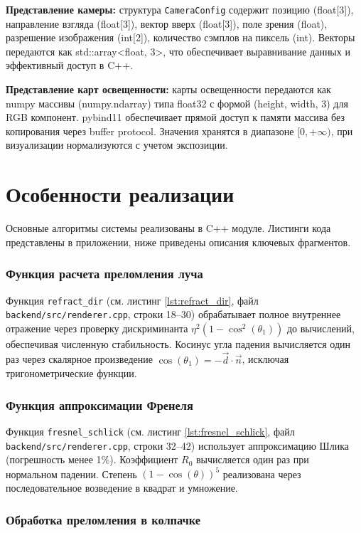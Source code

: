 \textbf{Представление камеры:} структура \texttt{CameraConfig} содержит позицию (float[3]), направление взгляда (float[3]), вектор вверх (float[3]), поле зрения (float), разрешение изображения (int[2]), количество сэмплов на пиксель (int). Векторы передаются как std::array<float, 3>, что обеспечивает выравнивание данных и эффективный доступ в C++.

\textbf{Представление карт освещенности:} карты освещенности передаются как numpy массивы (numpy.ndarray) типа float32 с формой (height, width, 3) для RGB компонент. pybind11 обеспечивает прямой доступ к памяти массива без копирования через buffer protocol. Значения хранятся в диапазоне $[0, +\infty)$, при визуализации нормализуются с учетом экспозиции.

\section{Особенности реализации}

Основные алгоритмы системы реализованы в C++ модуле. Листинги кода представлены в приложении, ниже приведены описания ключевых фрагментов.

\subsubsection{Функция расчета преломления луча}

Функция \texttt{refract\_dir} (см. листинг \ref{lst:refract_dir}, файл \texttt{backend/src/renderer.cpp}, строки 18--30) обрабатывает полное внутреннее отражение через проверку дискриминанта $\eta^2 (1 - \cos^2(\theta_1))$ до вычислений, обеспечивая численную стабильность. Косинус угла падения вычисляется один раз через скалярное произведение $\cos(\theta_1) = -\vec{d} \cdot \vec{n}$, исключая тригонометрические функции.

\subsubsection{Функция аппроксимации Френеля}

Функция \texttt{fresnel\_schlick} (см. листинг \ref{lst:fresnel_schlick}, файл \texttt{backend/src/renderer.cpp}, строки 32--42) использует аппроксимацию Шлика (погрешность менее 1\%). Коэффициент $R_0$ вычисляется один раз при нормальном падении. Степень $(1 - \cos(\theta))^5$ реализована через последовательное возведение в квадрат и умножение.

\subsubsection{Обработка преломления в колпачке}

